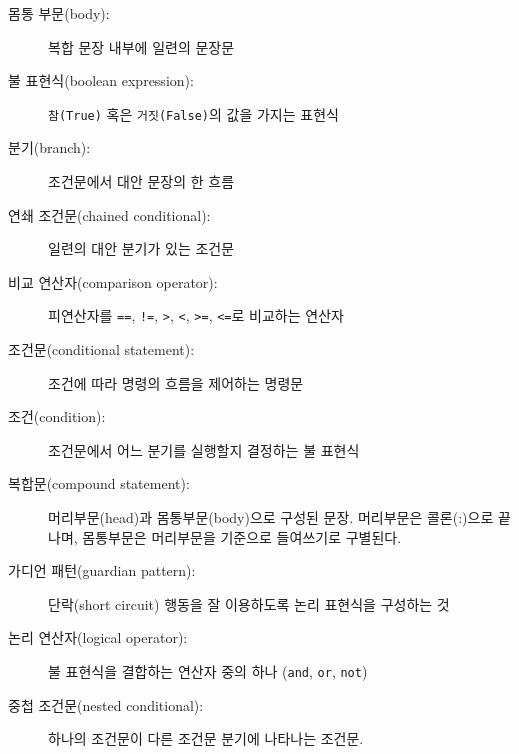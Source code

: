 \begin{description}

\item[몸통 부문(body):] 복합 문장 내부에 일련의 문장문

\item[불 표현식(boolean expression):] {\tt 참(True)} 혹은 {\tt 거짓(False)}의 값을 가지는 표현식

\item[분기(branch):] 조건문에서 대안 문장의 한 흐름

\item[연쇄 조건문(chained conditional):] 일련의 대안 분기가 있는 조건문

\item[비교 연산자(comparison operator):] 피연산자를 {\tt ==}, {\tt !=}, {\tt >}, {\tt <}, {\tt >=}, {\tt <=}로 비교하는 연산자

\item[조건문(conditional statement):] 조건에 따라 명령의 흐름을 제어하는 명령문

\item[조건(condition):] 조건문에서 어느 분기를 실행할지 결정하는 불 표현식

\item[복합문(compound statement):] 머리부문(head)과 몸통부문(body)으로 구성된 문장.
머리부문은 콜론(:)으로 끝나며, 몸통부문은 머리부문을 기준으로 들여쓰기로 구별된다.

\item[가디언 패턴(guardian pattern):] 단락(short circuit) 행동을 잘 이용하도록 논리 표현식을 구성하는 것

\item[논리 연산자(logical operator):] 불 표현식을 결합하는 연산자 중의 하나 ({\tt and}, {\tt or}, {\tt not})

\item[중첩 조건문(nested conditional):] 하나의 조건문이 다른 조건문 분기에 나타나는 조건문.


\end{description}
